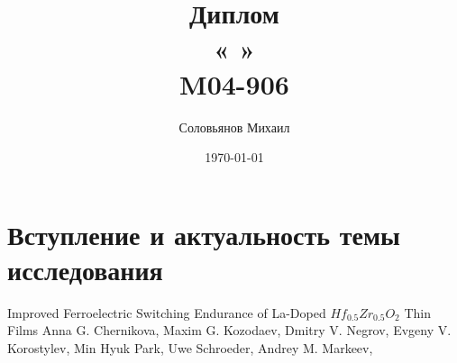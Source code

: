 \documentclass[a4paper,12pt]{article} %
\author{Соловьянов Михаил}
\title{Диплом \\ \LARGE{«
»\\ M04-906}}
\date{\today}
\begin{document}

\tableofcontents
{}
\newpage



\section{Вступление и актуальность темы исследования}






\begin{thebibliography}{}
      Improved Ferroelectric Switching Endurance of La-Doped $Hf_{0.5}Zr_{0.5}O_2$
Thin Films
Anna G. Chernikova, Maxim G. Kozodaev, Dmitry V. Negrov, Evgeny V. Korostylev,
Min Hyuk Park, Uwe Schroeder, Andrey M. Markeev,



\end{thebibliography}
\end{document}
